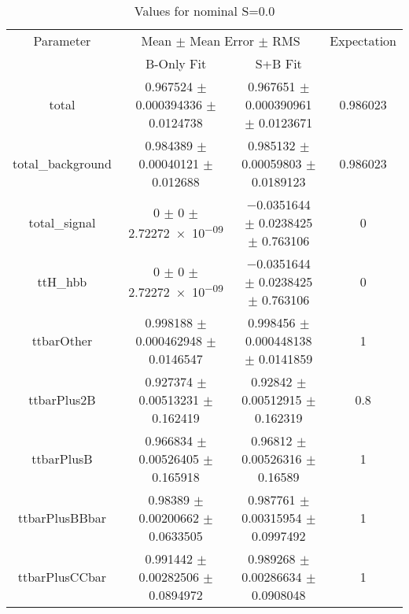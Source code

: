 \begin{table}
\centering
\caption{Values for nominal S=0.0}
\begin{tabular}{cccc}
\toprule
Parameter & \multicolumn{2}{c}{Mean $\pm$ Mean Error $\pm$ RMS} & Expectation\\
 & B-Only Fit & S+B Fit & \\
\midrule
total & \num{0.967524} $\pm$ \num{0.000394336} $\pm$ \num{0.0124738} & \num{0.967651} $\pm$ \num{0.000390961} $\pm$ \num{0.0123671} & \num{0.986023}\\
total\_background & \num{0.984389} $\pm$ \num{0.00040121} $\pm$ \num{0.012688} & \num{0.985132} $\pm$ \num{0.00059803} $\pm$ \num{0.0189123} & \num{0.986023}\\
total\_signal & \num{0} $\pm$ \num{0} $\pm$ \num{2.72272e-09} & \num{-0.0351644} $\pm$ \num{0.0238425} $\pm$ \num{0.763106} & \num{0}\\
ttH\_hbb & \num{0} $\pm$ \num{0} $\pm$ \num{2.72272e-09} & \num{-0.0351644} $\pm$ \num{0.0238425} $\pm$ \num{0.763106} & \num{0}\\
ttbarOther & \num{0.998188} $\pm$ \num{0.000462948} $\pm$ \num{0.0146547} & \num{0.998456} $\pm$ \num{0.000448138} $\pm$ \num{0.0141859} & \num{1}\\
ttbarPlus2B & \num{0.927374} $\pm$ \num{0.00513231} $\pm$ \num{0.162419} & \num{0.92842} $\pm$ \num{0.00512915} $\pm$ \num{0.162319} & \num{0.8}\\
ttbarPlusB & \num{0.966834} $\pm$ \num{0.00526405} $\pm$ \num{0.165918} & \num{0.96812} $\pm$ \num{0.00526316} $\pm$ \num{0.16589} & \num{1}\\
ttbarPlusBBbar & \num{0.98389} $\pm$ \num{0.00200662} $\pm$ \num{0.0633505} & \num{0.987761} $\pm$ \num{0.00315954} $\pm$ \num{0.0997492} & \num{1}\\
ttbarPlusCCbar & \num{0.991442} $\pm$ \num{0.00282506} $\pm$ \num{0.0894972} & \num{0.989268} $\pm$ \num{0.00286634} $\pm$ \num{0.0908048} & \num{1}\\
\bottomrule
\end{tabular}
\end{table}